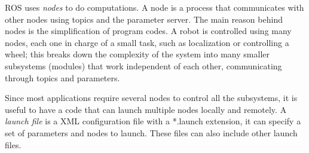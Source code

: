 ROS uses \textit{nodes} to do computations. A node is a process that communicates with other nodes using topics and the parameter server. The main reason behind nodes is the simplification of program codes. A robot is controlled using many nodes, each one in charge of a small task, such as localization or controlling a wheel; this breaks down the complexity of the system into many smaller subsystems (modules) that work independent of each other, communicating through topics and parameters.

Since most applications require several nodes to control all the subsystems, it is useful to have a code that can launch multiple nodes locally and remotely. A \textit{launch file} is a XML configuration file with a *.launch extension, it can specify a set of parameters and nodes to launch. These files can also include other launch files. 


